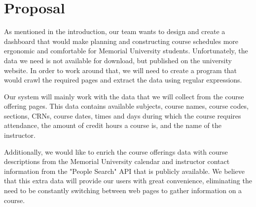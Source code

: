 \documentclass[12pt]{article}
\begin{document}
\section{Proposal}
As mentioned in the introduction, our team wants to design and create a dashboard that would make planning and constructing course schedules more ergonomic and comfortable for Memorial University students. 
Unfortunately, the data we need is not available for download, but published on the university website. In order to work around that, we will need to create a program that would crawl the required pages and extract 
the data using regular expressions. \par
Our system will mainly work with the data that we will collect from the course offering pages. This data contains available subjects, course names, course codes, sections, CRNs, course dates, times and days 
during which the course requires attendance, the amount of credit hours a course is, and the name of the instructor. \par
Additionally, we would like to enrich the course offerings data with course descriptions from the Memorial University calendar and instructor contact information from the "People Search" API that is publicly 
available. We believe that this extra data will provide our users with great convenience, eliminating the need to be constantly switching between web pages to gather information on a course.
\end{document}
